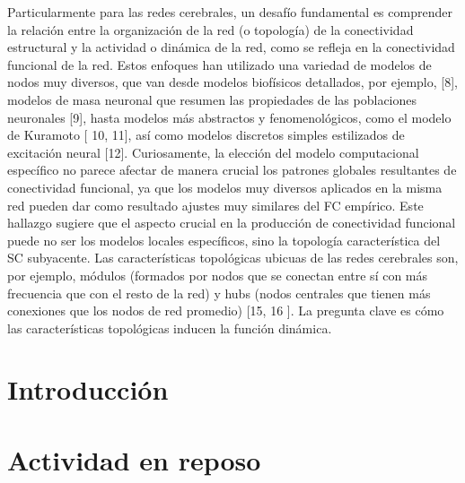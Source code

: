 
Particularmente para las redes cerebrales, un desafío fundamental es comprender la relación entre la organización de la red (o topología) de la conectividad estructural y la actividad o dinámica de la red, como se refleja en la conectividad funcional de la red.  Estos enfoques han utilizado una variedad de modelos de nodos muy diversos, que van desde modelos biofísicos detallados, por ejemplo, [8], modelos de masa neuronal que resumen las propiedades de las poblaciones neuronales [9], hasta modelos más abstractos y fenomenológicos, como el modelo de Kuramoto [ 10, 11], así como modelos discretos simples estilizados de excitación neural [12]. Curiosamente, la elección del modelo computacional específico no parece afectar de manera crucial los patrones globales resultantes de conectividad funcional, ya que los modelos muy diversos aplicados en la misma red pueden dar como resultado ajustes muy similares del FC empírico. Este hallazgo sugiere que el aspecto crucial en la producción de conectividad funcional puede no ser los modelos locales específicos, sino la topología característica del SC subyacente. Las características topológicas ubicuas de las redes cerebrales son, por ejemplo, módulos (formados por nodos que se conectan entre sí con más frecuencia que con el resto de la red) y hubs (nodos centrales que tienen más conexiones que los nodos de red promedio) [15, 16 ]. La pregunta clave es cómo las características topológicas inducen la función dinámica.



\section{Introducción}

\section{Actividad en reposo}\label{sec:actividad-reposo}



